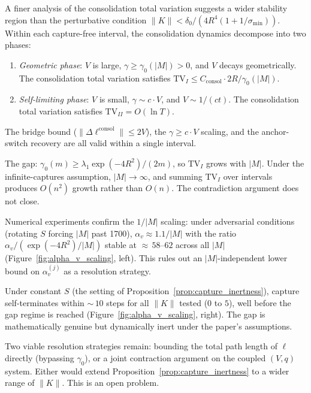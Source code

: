 \begin{remark}
\label{rem:phase_decomposition}
\leanok
{}
A finer analysis of the consolidation total variation suggests a wider stability region than the perturbative condition $\|K\| < \delta_0/(4R^4(1 + 1/\sigma_{\min}))$.  Within each capture-free interval, the consolidation dynamics decompose into two phases:
\begin{enumerate}
\item \emph{Geometric phase}: $V$ is large, $\gamma \geq \gamma_0(|M|) > 0$, and $V$ decays geometrically.  The consolidation total variation satisfies $\mathrm{TV}_I \leq C_{\mathrm{consol}} \cdot 2R/\gamma_0(|M|)$.
\item \emph{Self-limiting phase}: $V$ is small, $\gamma \sim c \cdot V$, and $V \sim 1/(ct)$.  The consolidation total variation satisfies $\mathrm{TV}_{II} = O(\ln T)$.
\end{enumerate}
The bridge bound ($\|\Delta \ell^{\mathrm{consol}}\| \leq 2V$), the $\gamma \geq c \cdot V$ scaling, and the anchor-switch recovery are all valid within a single interval.

The gap: $\gamma_0(m) \geq \lambda_1 \exp(-4R^2)/(2m)$, so $\mathrm{TV}_I$ grows with $|M|$.  Under the infinite-captures assumption, $|M| \to \infty$, and summing $\mathrm{TV}_I$ over intervals produces $O(n^2)$ growth rather than $O(n)$.  The contradiction argument does not close.

Numerical experiments confirm the $1/|M|$ scaling: under adversarial conditions (rotating $S$ forcing $|M|$ past 1700), $\alpha_v \approx 1.1/|M|$ with the ratio $\alpha_v / (\exp(-4R^2)/|M|)$ stable at ${\approx}\,58$--$62$ across all $|M|$ (Figure~\ref{fig:alpha_v_scaling}, left).  This rules out an $|M|$-independent lower bound on $\alpha_v^{(j)}$ as a resolution strategy.

Under constant $S$ (the setting of Proposition~\ref{prop:capture_inertness}), capture self-terminates within ${\sim}\,10$ steps for all $\|K\|$ tested ($0$ to $5$), well before the gap regime is reached (Figure~\ref{fig:alpha_v_scaling}, right).  The gap is mathematically genuine but dynamically inert under the paper's assumptions.

Two viable resolution strategies remain: bounding the total path length of $\ell$ directly (bypassing $\gamma_0$), or a joint contraction argument on the coupled $(V, q)$ system.  Either would extend Proposition~\ref{prop:capture_inertness} to a wider range of $\|K\|$.  This is an open problem.
\end{remark}

